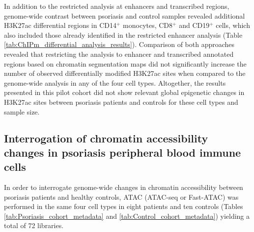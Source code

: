 In addition to the restricted analysis at enhancers and transcribed regions, genome-wide contrast between psoriasis and control samples revealed additional H3K27ac differential regions in CD14$^+$ monocytes, CD8$^+$ and CD19$^+$ cells, which also included those already identified in the restricted enhancer analysis (Table \ref{tab:ChIPm_differential_analysis_results}). Comparison of both approaches revealed that restricting the analysis to enhancer and transcribed annotated regions based on chromatin segmentation maps did not significantly increase the number of observed differentially modified H3K27ac sites when compared to the genome-wide analysis in any of the four cell types. Altogether, the results presented in this pilot cohort did not show relevant global epigenetic changes in H3K27ac sites between psoriasis patients and controls for these cell types and sample size.




\subsection{Interrogation of chromatin accessibility changes in  psoriasis peripheral blood immune cells}

In order to interrogate genome-wide changes in chromatin accessibility between psoriasis patients and healthy controls, ATAC (ATAC-seq or Fast-ATAC) was performed in the same four cell types in eight patients and ten controls (Tables \ref{tab:Psoriasis_cohort_metadata} and \ref{tab:Control_cohort_metadata}) yielding a total of 72 libraries.



